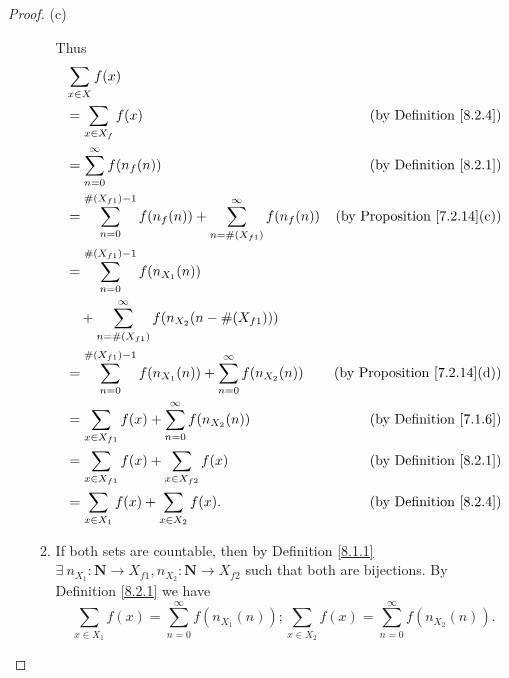 \begin{proof}{(c)}
\begin{enumerate}[label=(\Roman*)]
\begin{enumerate}[label=(\roman*)]
                        Thus
                        \begin{align*}
                             & \sum_{x \in X} f(x)                                                                                                                               \\
                             & = \sum_{x \in X_f} f(x)                                                                                 & \text{(by Definition \ref{8.2.4})}      \\
                             & = \sum_{n = 0}^\infty f(n_f(n))                                                                         & \text{(by Definition \ref{8.2.1})}      \\
                             & = \sum_{n = 0}^{\#(X_{f1}) - 1} f(n_f(n)) + \sum_{n = \#(X_{f1})}^\infty f(n_f(n))                      & \text{(by Proposition \ref{7.2.14}(c))} \\
                             & = \sum_{n = 0}^{\#(X_{f1}) - 1} f(n_{X_1}(n)) \\
                             & \quad + \sum_{n = \#(X_{f1})}^\infty f(n_{X_2}(n - \#(X_{f1})))                                           \\
                             & = \sum_{n = 0}^{\#(X_{f1}) - 1} f(n_{X_1}(n)) + \sum_{n = 0}^\infty f(n_{X_2}(n))                       & \text{(by Proposition \ref{7.2.14}(d))} \\
                             & = \sum_{x \in X_{f1}} f(x) + \sum_{n = 0}^\infty f(n_{X_2}(n))                                          & \text{(by Definition \ref{7.1.6})}      \\
                             & = \sum_{x \in X_{f1}} f(x) + \sum_{x \in X_{f2}} f(x)                                                   & \text{(by Definition \ref{8.2.1})}      \\
                             & = \sum_{x \in X_1} f(x) + \sum_{x \in X_2} f(x).                                                        & \text{(by Definition \ref{8.2.4})}
                        \end{align*}
                  \item If both sets are countable, then by Definition \ref{8.1.1} \(\exists\ n_{X_1} : \mathbf{N} \to X_{f1}, n_{X_2} : \mathbf{N} \to X_{f2}\) such that both are bijections.
                  By Definition \ref{8.2.1} we have
                  \[
                      \sum_{x \in X_1} f(x) = \sum_{n = 0}^\infty f(n_{X_1}(n)) ; \sum_{x \in X_2} f(x) = \sum_{n = 0}^\infty f(n_{X_2}(n)).
\]
\end{enumerate}
\end{enumerate}
\end{proof}
